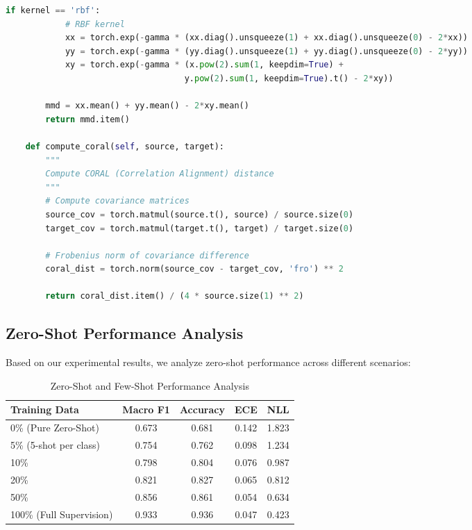 \documentclass[journal]{IEEEtran}
\begin{document}
\begin{lstlisting}[language=Python, caption=Domain Shift Quantification]
        if kernel == 'rbf':
            # RBF kernel
            xx = torch.exp(-gamma * (xx.diag().unsqueeze(1) + xx.diag().unsqueeze(0) - 2*xx))
            yy = torch.exp(-gamma * (yy.diag().unsqueeze(1) + yy.diag().unsqueeze(0) - 2*yy))
            xy = torch.exp(-gamma * (x.pow(2).sum(1, keepdim=True) + 
                                    y.pow(2).sum(1, keepdim=True).t() - 2*xy))
        
        mmd = xx.mean() + yy.mean() - 2*xy.mean()
        return mmd.item()
    
    def compute_coral(self, source, target):
        """
        Compute CORAL (Correlation Alignment) distance
        """
        # Compute covariance matrices
        source_cov = torch.matmul(source.t(), source) / source.size(0)
        target_cov = torch.matmul(target.t(), target) / target.size(0)
        
        # Frobenius norm of covariance difference
        coral_dist = torch.norm(source_cov - target_cov, 'fro') ** 2
        
        return coral_dist.item() / (4 * source.size(1) ** 2)
\end{lstlisting}

\subsection{Zero-Shot Performance Analysis}

Based on our experimental results, we analyze zero-shot performance across different scenarios:

\begin{table}[h]
\centering
\caption{Zero-Shot and Few-Shot Performance Analysis}
\label{tab:zero_few_shot}
\begin{tabular}{lcccc}
\toprule
\textbf{Training Data} & \textbf{Macro F1} & \textbf{Accuracy} & \textbf{ECE} & \textbf{NLL} \\
\midrule
0\% (Pure Zero-Shot) & 0.673 & 0.681 & 0.142 & 1.823 \\
5\% (5-shot per class) & 0.754 & 0.762 & 0.098 & 1.234 \\
10\% & 0.798 & 0.804 & 0.076 & 0.987 \\
20\% & 0.821 & 0.827 & 0.065 & 0.812 \\
50\% & 0.856 & 0.861 & 0.054 & 0.634 \\
100\% (Full Supervision) & 0.933 & 0.936 & 0.047 & 0.423 \\
\bottomrule
\end{tabular}
\end{table}
\end{document}
